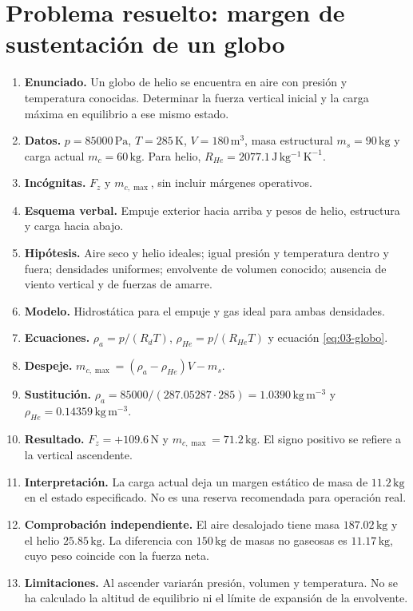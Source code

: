 \section{Problema resuelto: margen de sustentación de un globo}
\begin{enumerate}
\item \textbf{Enunciado.} Un globo de helio se encuentra en aire con presión y temperatura conocidas. Determinar la fuerza vertical inicial y la carga máxima en equilibrio a ese mismo estado.
\item \textbf{Datos.} $p=85000\,\mathrm{Pa}$, $T=285\,\mathrm{K}$, $V=180\,\mathrm{m^3}$, masa estructural $m_s=90\,\mathrm{kg}$ y carga actual $m_c=60\,\mathrm{kg}$. Para helio, $R_{He}=2077.1\,\mathrm{J\,kg^{-1}\,K^{-1}}$.
\item \textbf{Incógnitas.} $F_z$ y $m_{c,\max}$, sin incluir márgenes operativos.
\item \textbf{Esquema verbal.} Empuje exterior hacia arriba y pesos de helio, estructura y carga hacia abajo.
\item \textbf{Hipótesis.} Aire seco y helio ideales; igual presión y temperatura dentro y fuera; densidades uniformes; envolvente de volumen conocido; ausencia de viento vertical y de fuerzas de amarre.
\item \textbf{Modelo.} Hidrostática para el empuje y gas ideal para ambas densidades.
\item \textbf{Ecuaciones.} $\rho_a=p/(R_dT)$, $\rho_{He}=p/(R_{He}T)$ y ecuación \eqref{eq:03-globo}.
\item \textbf{Despeje.} $m_{c,\max}=(\rho_a-\rho_{He})V-m_s$.
\item \textbf{Sustitución.} $\rho_a=85000/(287.05287\cdot285)=1.0390\,\mathrm{kg\,m^{-3}}$ y $\rho_{He}=0.14359\,\mathrm{kg\,m^{-3}}$.
\item \textbf{Resultado.} $F_z=+109.6\,\mathrm{N}$ y $m_{c,\max}=71.2\,\mathrm{kg}$. El signo positivo se refiere a la vertical ascendente.
\item \textbf{Interpretación.} La carga actual deja un margen estático de masa de $11.2\,\mathrm{kg}$ en el estado especificado. No es una reserva recomendada para operación real.
\item \textbf{Comprobación independiente.} El aire desalojado tiene masa $187.02\,\mathrm{kg}$ y el helio $25.85\,\mathrm{kg}$. La diferencia con $150\,\mathrm{kg}$ de masas no gaseosas es $11.17\,\mathrm{kg}$, cuyo peso coincide con la fuerza neta.
\item \textbf{Limitaciones.} Al ascender variarán presión, volumen y temperatura. No se ha calculado la altitud de equilibrio ni el límite de expansión de la envolvente.
\end{enumerate}

